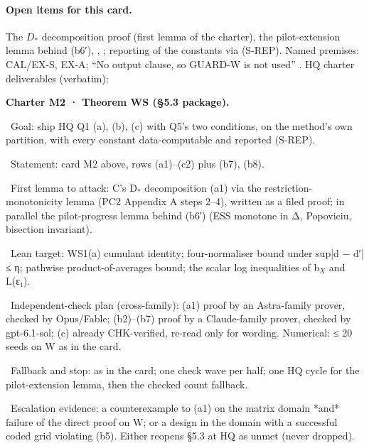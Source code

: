 \paragraph{Open items for this card.} The $D_{*}$ decomposition proof (first lemma of the charter), the pilot-extension lemma behind (b6′), , ; reporting of the constants via  (S-REP). Named premises: CAL/EX-S, EX-A; ``No output clause, so GUARD-W is not used'' . HQ charter deliverables (verbatim):
\par\noindent \textbf{Charter M2 · Theorem WS (§5.3 package).}
\par\noindent \textbullet~Goal: ship HQ Q1 (a), (b), (c) with Q5's two conditions, on the method's own partition, with every constant data-computable and reported (S-REP).
\par\noindent \textbullet~Statement: card M2 above, rows (a1)–(c2) plus (b7), (b8).
\par\noindent \textbullet~First lemma to attack: C's D$_{*}$ decomposition (a1) via the restriction-monotonicity lemma (PC2 Appendix A steps 2–4), written as a filed proof; in parallel the pilot-progress lemma behind (b6′) (ESS monotone in Δ, Popoviciu, bisection invariant).
\par\noindent \textbullet~Lean target: WS1(a) cumulant identity; four-normaliser bound under sup|d − d′| ≤ η; pathwise product-of-averages bound; the scalar log inequalities of b$_{X}$ and L(ε₁).
\par\noindent \textbullet~Independent-check plan (cross-family): (a1) proof by an Astra-family prover, checked by Opus/Fable; (b2)–(b7) proof by a Claude-family prover, checked by gpt-6.1-sol; (c) already CHK-verified, re-read only for wording. Numerical: ≤ 20 seeds on W as in the card.
\par\noindent \textbullet~Fallback and stop: as in the card; one check wave per half; one HQ cycle for the pilot-extension lemma, then the checked count fallback.
\par\noindent \textbullet~Escalation evidence: a counterexample to (a1) on the matrix domain *and* failure of the direct proof on W; or a design in the domain with a successful coded grid violating (b5). Either reopens §5.3 at HQ as unmet (never dropped).

